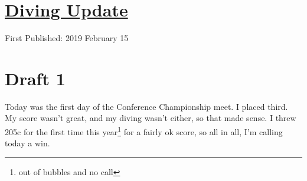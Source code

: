 \documentclass[12pt]{article}[titlepage]
\newcommand{\1}{\={a}}
\newcommand{\2}{\={e}}
\newcommand{\3}{\={\i}}
\newcommand{\4}{\=o}
\newcommand{\5}{\=u}
\newcommand{\6}{\={A}}
\renewcommand{\,}{\textsuperscript{,}}
\begin{document}
\doublespacing
\section{\href{diving-15-feb.html}{Diving Update}}
First Published: 2019 February 15
\section{Draft 1}
Today was the first day of the Conference Championship meet.
I placed third.
My score wasn't great, and my diving wasn't either, so that made sense.
I threw 205c for the first time this year\footnote{out of bubbles and no call} for a fairly ok score, so all in all, I'm calling today a win.
\end{document}
